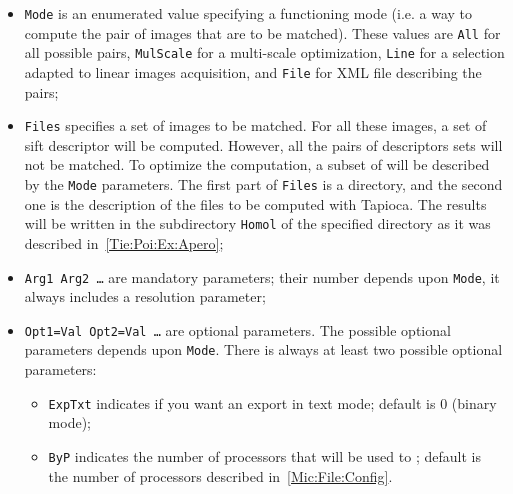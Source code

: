 \begin{itemize}

    \item {\tt Mode} is an enumerated value specifying a functioning mode
          (i.e. a way to compute the pair of images that are to be matched).
          These values are {\tt All} for all possible pairs, {\tt MulScale}
          for a multi-scale optimization, {\tt Line} for a selection adapted
          to linear images acquisition, and {\tt File} for  XML file
          describing the pairs;

    \item {\tt Files} specifies a set of images to be matched. For all these
         images, a set of sift descriptor will be computed. However, all the pairs of
         descriptors sets will not be  matched. To optimize the computation, a subset
         of  will be described by the {\tt Mode} parameters.
         The first part of {\tt Files} is a directory, and the second one is the description
         of the files to be computed with Tapioca.
         The results will be written in the subdirectory {\tt Homol} of the
         specified directory as it was described in~\ref{Tie:Poi:Ex:Apero};



    \item  {\tt Arg1 Arg2  \dots} are mandatory parameters; their number depends
           upon {\tt Mode}, it always includes a resolution parameter;

    \item  {\tt  Opt1=Val Opt2=Val  \dots} are optional parameters. The possible
           optional parameters depends upon {\tt Mode}.
           There is always at least two possible optional parameters:

            \begin{itemize}
                 \item {\tt ExpTxt} indicates if you want an export in text mode;
                       default is $0$ (binary mode);

                 \item {\tt ByP} indicates the number of processors that will be used
                        to ; %
                       default is the number of
                        processors described in~\ref{Mic:File:Config}.
            \end{itemize}

\end{itemize}

